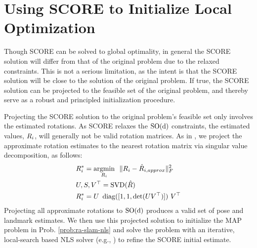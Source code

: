 \section{Using SCORE to Initialize Local Optimization}
\label{sec:score-to-initialize}

Though SCORE can be solved to global optimality, in general the SCORE solution
will differ from that of the original problem due to the relaxed constraints.
This is not a serious limitation, as the intent is that the SCORE solution will
be close to the solution of the original problem. If true, the SCORE solution
can be projected to the feasible set of the original problem, and thereby serve
as a robust and principled initialization procedure.

Projecting the SCORE solution to the original problem's feasible set only
involves the estimated rotations. As SCORE relaxes the $\operatorname{{\operatorname{SO}}(d)}$ constraints, the
estimated values, $R_i$, will generally not be valid rotation matrices. As in
\cite{martinec07cvpr}, we project the approximate rotation estimates to the
nearest rotation matrix via singular value decomposition, as follows:
\begin{align}
    & {R}^{*}_i = \operatorname*{argmin}_{R_i}~~\lVert R_i - \hat{R}_{i,approx} \rVert_F^2 \label{eq:single-rotation-frob} \\
    & U,S,V^\top = \operatorname*{SVD}(\hat{R}) \label{eq:SVD} \\
    & {R}^{*}_i = U ~ \operatorname{diag}([1, 1, \det(U V^\top)]) ~ V^\top \label{eq:SOd-projection}
\end{align}
Projecting all approximate rotations to $\operatorname{{\operatorname{SO}}(d)}$ produces a valid set of pose and
landmark estimates. We then use this projected solution to initialize the MAP
problem in Prob. \ref{prob:ra-slam-nls} and solve the problem with an iterative,
local-search based NLS solver (e.g., \cite{dellaert2012techreport}) to refine
the SCORE initial estimate.